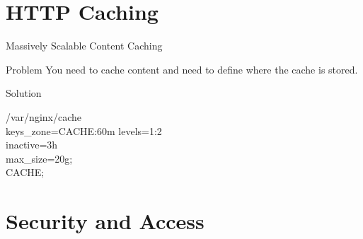 \documentclass{beamer}
\begin{document}
\section{HTTP Caching}
\begin{frame}{Massively Scalable Content Caching}
\scriptsize
\begin{minipage}[t]{0.8\textwidth}
\begin{block}{Problem}
	\vspace{0.01\textheight}
	You need to cache content and need to define where the cache is stored.
\end{block}
\begin{block}{Solution}
	\vspace{0.01\textheight}
	\begin{Alms*}
		
		 	/var/nginx/cache \NI
		\\
		keys\_zone=CACHE:60m
		levels=1:2 \\
		inactive=3h \\
		max\_size=20g;
		\\
		\ND {} CACHE;
		
	\end{Alms*}
\end{block}
\end{minipage}
\end{frame}


\section{Security and Access}
\end{document}
